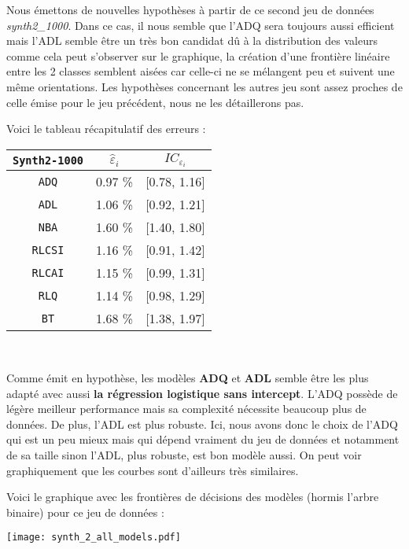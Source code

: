 \documentclass{article}
\begin{document}
\begin{multicols}{2}
Nous émettons de nouvelles hypothèses à partir de ce second jeu de données \textit{synth2\_1000}. Dans ce cas, il nous semble que l'ADQ sera toujours aussi efficient mais l'ADL semble être un très bon candidat dû à la distribution des valeurs comme cela peut s'observer sur le graphique, la création d'une frontière linéaire entre les 2 classes semblent aisées car celle-ci ne se mélangent peu et suivent une même orientations. Les hypothèses concernant les autres jeu sont assez proches de celle émise pour le jeu précédent, nous ne les détaillerons pas.

Voici le tableau récapitulatif des erreurs : 
\begin{center}
\begin{tabular}{| c || c | c |}
\hline
\texttt{Synth2-1000} & $\widehat{\varepsilon}_i$  & $IC_{\varepsilon_{i}}$  \\
\hline
\hline
\texttt{ADQ} & 0.97 \% & [0.78, 1.16] \\
\hline
\texttt{ADL} & 1.06 \% & [0.92, 1.21] \\
\hline
\texttt{NBA} & 1.60 \% & [1.40, 1.80] \\
\hline
\texttt{RLCSI} & 1.16 \% & [0.91, 1.42] \\
\hline
\texttt{RLCAI} & 1.15 \% & [0.99, 1.31] \\
\hline
\texttt{RLQ} &  1.14 \% & [0.98, 1.29] \\
\hline
\texttt{BT} & 1.68 \% & [1.38, 1.97] \\
\hline
\end{tabular}\\
\label{table_Synth2-1000}
\end{center}
Comme émit en hypothèse, les modèles \textbf{ADQ} et \textbf{ADL} semble être les plus adapté avec aussi \textbf{la régression logistique sans intercept}.
L'ADQ possède de légère meilleur performance mais sa complexité nécessite beaucoup plus de données. De plus, l'ADL est plus robuste.
Ici, nous avons donc le choix de l'ADQ qui est un peu mieux mais qui dépend vraiment du jeu de données et notamment de sa taille sinon l'ADL, plus robuste, est bon modèle aussi. On peut voir graphiquement que les courbes sont d'ailleurs très similaires.

\newpage

Voici le graphique avec les frontières de décisions des modèles (hormis l'arbre binaire) pour ce jeu de données :

\begingroup
   \centering
   \texttt{[image: synth\_2\_all\_models.pdf]}
    \label{fig_synth_2_adq_1000}
\endgroup


\end{multicols}
\end{document}

